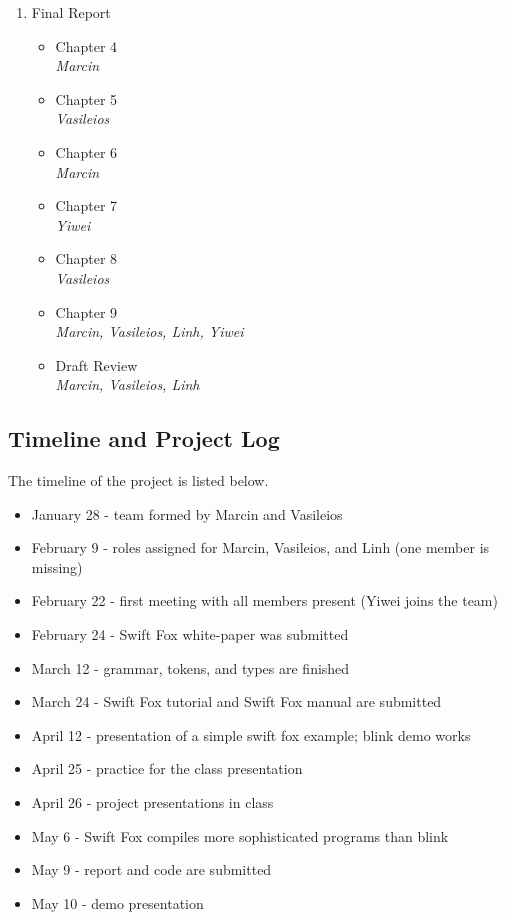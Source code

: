 \begin{enumerate}
  \item Final Report
    \begin{itemize}
      \item Chapter 4\\\textit{Marcin}
      \item Chapter 5\\\textit{Vasileios}
      \item Chapter 6\\\textit{Marcin}
      \item Chapter 7\\\textit{Yiwei}
      \item Chapter 8\\\textit{Vasileios}
      \item Chapter 9\\\textit{Marcin, Vasileios, Linh, Yiwei}
      \item Draft Review\\\textit{Marcin, Vasileios, Linh}
    \end{itemize}
\end{enumerate}


\subsection{Timeline and Project Log}

The timeline of the project is listed below.

\begin{itemize}
\item January 28 - team formed by Marcin and Vasileios
\item February 9 - roles assigned for Marcin, Vasileios, and Linh (one member is missing)
\item February 22 - first meeting with all members present (Yiwei joins the team)
\item February 24 - Swift Fox white-paper was submitted 
\item March 12 - grammar, tokens, and types are finished
\item March 24 - Swift Fox tutorial and Swift Fox manual are submitted
\item April 12 - presentation of a simple swift fox example; blink demo works
\item April 25 - practice for the class presentation
\item April 26 - project presentations in class
\item May 6 - Swift Fox compiles more sophisticated programs than blink 
\item May 9 - report and code are submitted
\item May 10 - demo presentation
\end{itemize}

